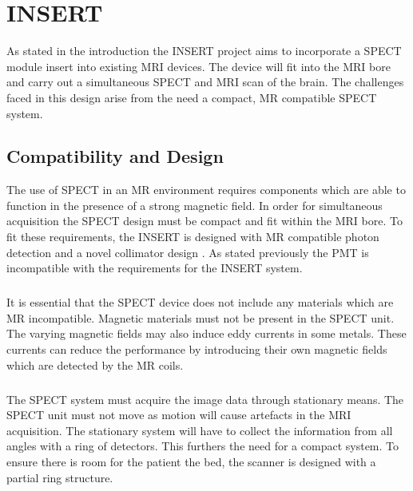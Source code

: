 \chapter{INSERT}
\label{LitRev}

As stated in the introduction the INSERT project aims to incorporate a SPECT module insert into existing MRI devices. The device will fit into the MRI bore and carry out a simultaneous SPECT and MRI scan of the brain. The challenges faced in this design arise from the need a compact, MR compatible SPECT system.
\section{Compatibility and Design}
 The use of SPECT in an MR environment requires components which are able to function in the presence of a strong magnetic field. In order for simultaneous acquisition the SPECT design must be compact and fit within the MRI bore. To fit these requirements, the INSERT is designed with MR compatible photon detection \cite{7287793} and a novel collimator design \cite{7181734}. As stated previously the PMT is incompatible with the requirements for the INSERT system. 
\paragraph{}
It is essential that the SPECT device does not include any materials which are MR incompatible. Magnetic materials must not be present in the SPECT unit. The varying magnetic fields may also induce eddy currents in some metals. These currents can reduce the performance by introducing their own magnetic fields which are detected by the MR coils. 
\paragraph{}
The SPECT system must acquire the image data through stationary means. The SPECT unit must not move as motion will cause artefacts in the MRI acquisition. The stationary system will have to collect the information from all angles with a ring of detectors. This furthers the need for a compact system. To ensure there is room for the patient the bed, the scanner is designed with a partial ring structure.
